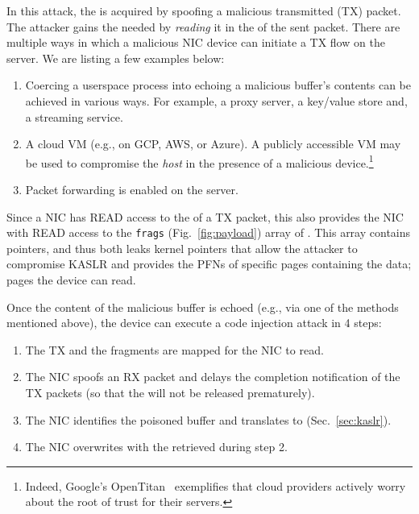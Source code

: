 In this attack, the \kva is acquired by spoofing a malicious transmitted (TX) packet. The attacker gains the needed \kva by \emph{reading} it in the \shinfo of the sent packet. 
%
There are multiple ways in which a malicious NIC device can initiate a TX flow on the server. We are listing a few examples below:
\begin{enumerate}
    \item Coercing a userspace process into echoing a malicious buffer's contents can be achieved in various ways. For example, a proxy server, a key/value store and, a streaming service.
    \item A cloud VM (e.g., on GCP, AWS, or Azure). A publicly accessible VM may be used to compromise the \emph{host} in the presence of a malicious device.\footnote{Indeed, Google's OpenTitan~\cite{opentitan} exemplifies that cloud providers actively worry about the root of trust for their servers.}
    \item Packet forwarding is enabled on the server.
\end{enumerate}
Since a NIC has READ access to the \shinfo{} of a TX packet, this also provides the NIC with READ access to the \texttt{frags} (Fig.~\ref{fig:payload}) array of \shinfo{}. This array contains \page{} pointers, and thus both leaks kernel pointers that allow the attacker to compromise KASLR and provides the PFNs of specific pages containing the data; pages the device can read.


Once the content of the malicious buffer is echoed (e.g., via one of the methods mentioned above), the device can execute a code injection attack in 4 steps:  
%
\begin{enumerate}[labelindent=3pt]
    \item The TX \data{} and the fragments are mapped for the NIC to read.
    \item The NIC spoofs an RX packet and delays the completion notification of the TX packets (so that the \mabaf{} will not be released prematurely).
    \item The NIC identifies the poisoned buffer and translates \page{} to \kva{} (Sec.~\ref{sec:kaslr}).
    \item The NIC overwrites \shinfo{} with the \kva{} retrieved during step 2. 
\end{enumerate}

